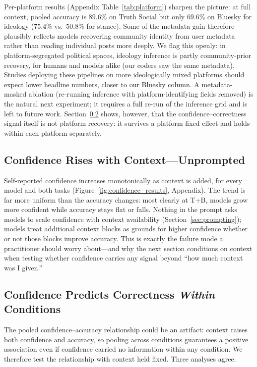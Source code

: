 \documentclass[11pt]{article}
\begin{document}
Per-platform results (Appendix Table~\ref{tab:platform}) sharpen the picture: at full context, pooled accuracy is $89.6\%$ on Truth Social but only $69.6\%$ on Bluesky for ideology ($75.4\%$ vs.\ $50.8\%$ for stance). Some of the metadata gain therefore plausibly reflects models recovering community identity from user metadata rather than reading individual posts more deeply. We flag this openly: in platform-segregated political spaces, ideology inference is partly community-prior recovery, for humans and models alike (our coders saw the same metadata). Studies deploying these pipelines on more ideologically mixed platforms should expect lower headline numbers, closer to our Bluesky column. A metadata-masked ablation (re-running inference with platform-identifying fields removed) is the natural next experiment; it requires a full re-run of the inference grid and is left to future work. Section~\ref{sec:results_within} shows, however, that the confidence--correctness signal itself is not platform recovery: it survives a platform fixed effect and holds within each platform separately.

\subsection{Confidence Rises with Context---Unprompted}
\label{sec:results_confidence}

Self-reported confidence increases monotonically as context is added, for every model and both tasks (Figure~\ref{fig:confidence_results}, Appendix). The trend is far more uniform than the accuracy changes: most clearly at T+B, models grow more confident while accuracy stays flat or falls. Nothing in the prompt asks models to scale confidence with context availability (Section~\ref{sec:prompting}); models treat additional context blocks as grounds for higher confidence whether or not those blocks improve accuracy. This is exactly the failure mode a practitioner should worry about---and why the next section conditions on context when testing whether confidence carries any signal beyond ``how much context was I given.''

\subsection{Confidence Predicts Correctness \emph{Within} Conditions}
\label{sec:results_within}

The pooled confidence--accuracy relationship could be an artifact: context raises both confidence and accuracy, so pooling across conditions guarantees a positive association even if confidence carried no information within any condition. We therefore test the relationship with context held fixed. Three analyses agree.
\end{document}
